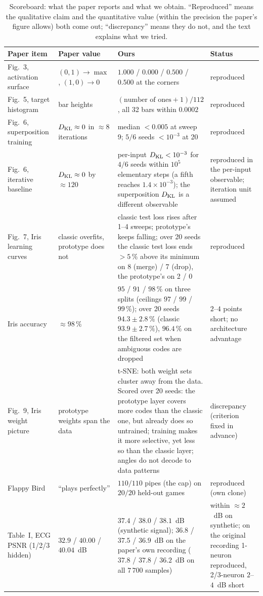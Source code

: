 \begin{table}[t]
\centering\small
\caption{Scoreboard: what the paper reports and what we obtain.  ``Reproduced'' means the
qualitative claim and the quantitative value (within the precision the paper's figure allows)
both come out; ``discrepancy'' means they do not, and the text explains what we tried.}
\label{tab:scoreboard}
\begin{tabularx}{\textwidth}{@{}>{\raggedright\arraybackslash}p{} >{\raggedright\arraybackslash}p{} X >{\raggedright\arraybackslash}p{}@{}}
\toprule
Paper item & Paper value & Ours & Status \\
\midrule
Fig.~3, activation surface & $(0,1)\!\to\!\max$, $(1,0)\!\to\!0$ & $1.000$ / $0.000$ / $0.500$ / $0.500$ at the corners & reproduced \\
Fig.~5, target histogram & bar heights & $(\text{number of ones}+1)/112$, all 32 bars within $0.0002$ & reproduced \\
Fig.~6, superposition training & $D_{\mathrm{KL}}\approx 0$ in $\approx 8$ iterations & median $<0.005$ at sweep 9; $5/6$ seeds $<10^{-3}$ at 20 & reproduced \\
Fig.~6, iterative baseline & $D_{\mathrm{KL}}\approx 0$ by $\approx 120$ & per-input $D_{\mathrm{KL}}<10^{-3}$ for $4/6$ seeds within $10^5$ elementary steps (a fifth reaches $1.4\times10^{-3}$); the superposition $D_{\mathrm{KL}}$ is a different observable & reproduced in the per-input observable; iteration unit assumed \\
Fig.~7, Iris learning curves & classic overfits, prototype does not & classic test loss rises after 1--4 sweeps; prototype's keeps falling; over 20 seeds the classic test loss ends $>5\,\%$ above its minimum on 8 (merge) / 7 (drop), the prototype's on 2 / 0 & reproduced \\
Iris accuracy & $\approx 98\,\%$ & $95$ / $91$ / $98\,\%$ on three splits (ceilings $97$ / $99$ / $99\,\%$); over 20 seeds $94.3\pm2.8\,\%$ (classic $93.9\pm2.7\,\%$), $96.4\,\%$ on the filtered set when ambiguous codes are dropped & $2$--$4$ points short; no architecture advantage \\
Fig.~9, Iris weight picture & prototype weights span the data & t-SNE: both weight sets cluster away from the data.  Scored over 20 seeds: the prototype layer covers more codes than the classic one, but already does so untrained; training makes it more selective, yet less so than the classic layer; angles do not decode to data patterns & discrepancy (criterion fixed in advance) \\
Flappy Bird & ``plays perfectly'' & $110/110$ pipes (the cap) on $20/20$ held-out games & reproduced (own clone) \\
Table~I, ECG PSNR (1/2/3 hidden) & $32.9$ / $40.00$ / $40.04$~dB & $37.4$ / $38.0$ / $38.1$~dB (synthetic signal); $36.8$ / $37.5$ / $36.9$~dB on the paper's own recording ($37.8$ / $37.8$ / $36.2$~dB on all $7\,700$ samples) & within $\approx 2$~dB on synthetic; on the original recording 1-neuron reproduced, 2/3-neuron $2$--$4$~dB short \\
\bottomrule
\end{tabularx}
\end{table}
